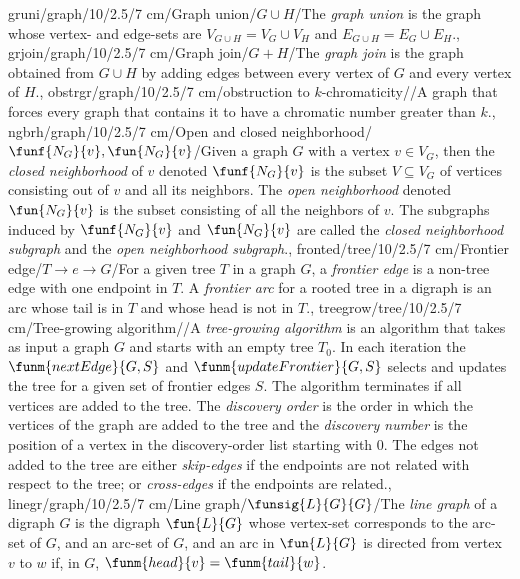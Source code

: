 gruni/graph/10/2.5/7 cm/{Graph union}/{$G\cup H$}/{The \emph{graph union} is the graph whose vertex- and edge-sets are $V_{G\cup H}=V_G\cup V_H$ and $E_{G\cup H}=E_G\cup E_H$.},
grjoin/graph/10/2.5/7 cm/{Graph join}/{$G+H$}/{The \emph{graph join} is the graph obtained from $G\cup H$ by adding edges between every vertex of $G$ and every vertex of $H$.},
obstrgr/graph/10/2.5/7 cm/{obstruction to $k$-chromaticity}/{}/{A graph that forces every graph that contains it to have a chromatic number greater than $k$.},
ngbrh/graph/10/2.5/7 cm/{Open and closed neighborhood}/{$\funf{N_G}{v},\fun{N_G}{v}$}/{Given a graph $G$ with a vertex $v\in V_G$, then the \emph{closed neighborhood} of $v$ denoted $\funf{N_G}{v}$ is the subset $V\subseteq V_G$ of vertices consisting out of $v$ and all its neighbors. The \emph{open neighborhood} denoted $\fun{N_G}{v}$ is the subset consisting of all the neighbors of $v$. The subgraphs induced by $\funf{N_G}{v}$ and $\fun{N_G}{v}$ are called the \emph{closed neighborhood subgraph} and the \emph{open neighborhood subgraph}.},
fronted/tree/10/2.5/7 cm/{Frontier edge}/{$T\rightarrow e\rightarrow G$}/{For a given tree $T$ in a graph $G$, a \emph{frontier edge} is a non-tree edge with one endpoint in $T$. A \emph{frontier arc} for a rooted tree in a digraph is an arc whose tail is in $T$ and whose head is not in $T$.},
treegrow/tree/10/2.5/7 cm/{Tree-growing algorithm}/{}/{A \emph{tree-growing algorithm} is an algorithm that takes as input a graph $G$ and starts with an empty tree $T_0$. In each iteration the $\funm{nextEdge}{G,S}$ and $\funm{updateFrontier}{G,S}$ selects and updates the tree for a given set of frontier edges $S$. The algorithm terminates if all vertices are added to the tree. The \emph{discovery order} is the order in which the vertices of the graph are added to the tree and the \emph{discovery number} is the position of a vertex in the discovery-order list starting with $0$. The edges not added to the tree are either \emph{skip-edges} if the endpoints are not related with respect to the tree; or \emph{cross-edges} if the endpoints are related.},
linegr/graph/10/2.5/7 cm/{Line graph}/{$\funsig{L}{G}{G}$}/{The \emph{line graph} of a digraph $G$ is the digraph $\fun{L}{G}$ whose vertex-set corresponds to the arc-set of $G$, and an arc-set of $G$, and an arc in $\fun{L}{G}$ is directed from vertex $v$ to $w$ if, in $G$, $\funm{head}{v}=\funm{tail}{w}$.}